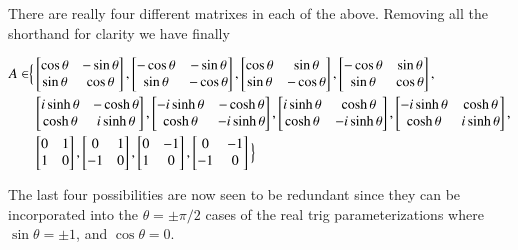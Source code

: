 There are really four different matrixes in each of the above.  Removing all the shorthand for clarity we have finally

\begin{align*}
A \in \Bigr\{
&\begin{bmatrix}
\cos\theta & - \sin\theta \\
\sin\theta & \cos\theta \\
\end{bmatrix}, 
\begin{bmatrix}
-\cos\theta & - \sin\theta \\
\sin\theta & -\cos\theta \\
\end{bmatrix}, 
\begin{bmatrix}
\cos\theta & \sin\theta \\
\sin\theta & - \cos\theta \\
\end{bmatrix}, 
\begin{bmatrix}
-\cos\theta & \sin\theta \\
\sin\theta & \cos\theta \\
\end{bmatrix}, \\
& 
\begin{bmatrix}
i \sinh\theta & -\cosh\theta \\
\cosh\theta  & i \sinh\theta \\
\end{bmatrix}, 
\begin{bmatrix}
-i \sinh\theta & -\cosh\theta \\
\cosh\theta  & -i \sinh\theta \\
\end{bmatrix}, 
\begin{bmatrix}
i \sinh\theta & \cosh\theta \\
\cosh\theta  & - i \sinh\theta \\
\end{bmatrix}, 
\begin{bmatrix}
-i \sinh\theta & \cosh\theta \\
\cosh\theta  & i \sinh\theta \\
\end{bmatrix}, 
\\
&
\begin{bmatrix}
0 & 1 \\
1 & 0 \\
\end{bmatrix},
\begin{bmatrix}
0 & 1 \\
-1 & 0 \\
\end{bmatrix},
\begin{bmatrix}
0 & -1 \\
1 & 0 \\
\end{bmatrix},
\begin{bmatrix}
0 & -1 \\
-1 & 0 \\
\end{bmatrix}
\Bigl\}
\end{align*}

The last four possibilities are now seen to be redundant since they can be incorporated into the $\theta = \pm \pi/2$ cases of the real trig parameterizations where $\sin\theta = \pm 1$, and $\cos\theta = 0$.

\EndNoBibArticle
